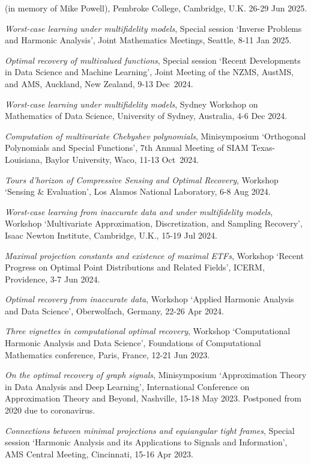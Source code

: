 \documentclass[11pt]{article}
\begin{document}
(in memory of Mike Powell),
Pembroke College, Cambridge, U.K. 
26-29 Jun 2025.
\item {\sl Worst-case learning under multifidelity models}, Special session `Inverse Problems and Harmonic Analysis', Joint Mathematics Meetings, Seattle, 8-11 Jan 2025. 
\item {\sl Optimal recovery of multivalued functions},
Special session `Recent Developments in Data Science and Machine Learning', 
Joint Meeting of the NZMS, AustMS, and AMS, Auckland, New Zealand, 9-13 Dec~2024.
\item {\sl Worst-case learning under multifidelity models},
Sydney Workshop on Mathematics of Data Science,
University of Sydney, Australia, 4-6 Dec 2024.
\item {\sl Computation of multivariate Chebyshev polynomials}, 
Minisymposium  `Orthogonal Polynomials and Special Functions',
7th Annual Meeting of SIAM Texas-Louisiana,
Baylor University, Waco, 11-13 Oct~2024.
\item {\sl Tours d’horizon of Compressive Sensing and Optimal Recovery},
Workshop `Sensing \& Evaluation', Los Alamos National Laboratory, 6-8 Aug 2024.
\item {\sl Worst-case learning from inaccurate data and under multifidelity models},
Workshop `Multivariate Approximation, Discretization, and Sampling Recovery',
Isaac Newton Institute, Cambridge, U.K., 15-19 Jul 2024.
\item {\sl Maximal projection constants and existence of maximal ETFs},
Workshop `Recent Progress on Optimal Point Distributions and Related Fields',
ICERM, Providence,  3-7 Jun 2024.
\item {\sl Optimal recovery from inaccurate data},
Workshop `Applied Harmonic Analysis and Data Science', Oberwolfach, Germany, 
22-26 Apr 2024.
\item {\sl Three vignettes in computational optimal recovery}, 
Workshop `Computational Harmonic Analysis and Data Science',
Foundations of Computational Mathematics conference, 
Paris, France, 12-21 Jun 2023.
\item {\sl  On the optimal recovery of graph signals},
Minisymposium `Approximation Theory in Data Analysis and Deep Learning',
International Conference on Approximation Theory and Beyond,
Nashville, 15-18 May 2023. {\small Postponed from 2020 due to coronavirus.}
\item {\sl Connections between minimal projections and equiangular tight frames}, Special session `Harmonic Analysis and its Applications to Signals and Information', AMS Central Meeting,  Cincinnati,  15-16 Apr 2023.
\end{document}
